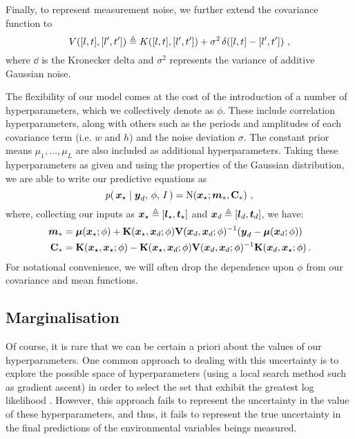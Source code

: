 \documentclass{acmtrans2m}
\begin{document}
Finally, to represent measurement noise, we further extend the covariance function to
\begin{equation*}
V([l,t],[l',t'])\triangleq K([l,t],[l',t'])+ \sigma^2\,\delta\!\left([l,t]-[l',t']\right)\,,
\end{equation*}
where $\dd{}{}$ is the Kronecker delta and $\sigma^2$ represents the variance of additive Gaussian noise.

The flexibility of our model comes at the cost of the introduction of a number of hyperparameters, which we collectively denote as $\phi$. These include correlation hyperparameters, along with others such as the periods and amplitudes of each covariance term (i.e. $w$ and $h$) and the noise deviation $\sigma$. The constant prior means $\mu_1,\ldots,\mu_L$ are also included as additional hyperparameters. Taking these hyperparameters as given and using the properties of the Gaussian distribution, we are able to write our predictive equations as
\begin{equation} \label{eq:GPMeanVar}
p\!\left(\,\boldsymbol{x}_\star\mid\boldsymbol{y}_d,\,\phi,\,I\,\right)=\text{N}\!\left(\boldsymbol{x}_\star;\boldsymbol{m}_\ast,\mathbf{C}_\ast\right)\,,
\end{equation}
where, collecting our inputs as $\boldsymbol{x}_\star\triangleq[\boldsymbol{l}_\star,\boldsymbol{t}_\star]$ and $\boldsymbol{x}_d\triangleq[\boldsymbol{l}_d,\boldsymbol{t}_d]$, we have:
\begin{align} 
\boldsymbol{m}_\ast&=\boldsymbol{\mu}(\boldsymbol{x}_\star;\phi)+\mathbf{K}(\boldsymbol{x}_\star,\boldsymbol{x}_d;\phi)\mathbf{V}(\boldsymbol{x}_d,\boldsymbol{x}_d;\phi)^{-1}(\boldsymbol{y}_d-\boldsymbol{\mu}(\boldsymbol{x}_d;\phi))\label{eq:GPMean}\\
\mathbf{C}_\ast&=\mathbf{K}(\boldsymbol{x}_\star,\boldsymbol{x}_\star;\phi)-\mathbf{K}(\boldsymbol{x}_\star,\boldsymbol{x}_d;\phi)\mathbf{V}(\boldsymbol{x}_d,\boldsymbol{x}_d;\phi)^{-1}\mathbf{K}(\boldsymbol{x}_d,\boldsymbol{x}_\star;\phi)\label{eq:GPVar}\,.
\end{align}
For notational convenience, we will often drop the dependence upon $\phi$ from our covariance and mean functions.

\subsection{Marginalisation}

\noindent Of course, it is rare that we can be certain a priori about the values of our hyperparameters. One common approach to dealing with this uncertainty is to explore the possible space of hyperparameters (using a local search method such as gradient ascent) in order to select the set that exhibit the greatest log likelihood \cite{GPsBook}. However, this approach fails to represent the uncertainty in the value of these hyperparameters, and thus, it fails to represent the true uncertainty in the final predictions of the environmental variables beings measured.
\end{document}
